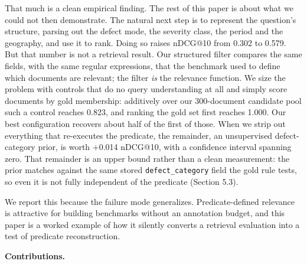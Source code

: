\documentclass[runningheads]{llncs}
\begin{document}
That much is a clean empirical finding. The rest of this paper is about what we could not then demonstrate. The natural next step is to represent the question's structure, parsing out the defect mode, the severity class, the period and the geography, and use it to rank. Doing so raises nDCG@10 from 0.302 to 0.579. But that number is not a retrieval result. Our structured filter compares the same fields, with the same regular expressions, that the benchmark used to define which documents are relevant; the filter \textit{is} the relevance function. We size the problem with controls that do no query understanding at all and simply score documents by gold membership: additively over our 300-document candidate pool such a control reaches 0.823, and ranking the gold set first reaches 1.000. Our best configuration recovers about half of the first of those. When we strip out everything that re-executes the predicate, the remainder, an unsupervised defect-category prior, is worth +0.014 nDCG@10, with a confidence interval spanning zero. That remainder is an upper bound rather than a clean measurement: the prior matches against the same stored \texttt{defect\_category} field the gold rule tests, so even it is not fully independent of the predicate (Section 5.3).

We report this because the failure mode generalizes. Predicate-defined relevance is attractive for building benchmarks without an annotation budget, and this paper is a worked example of how it silently converts a retrieval evaluation into a test of predicate reconstruction.

\textbf{Contributions.}
\end{document}
